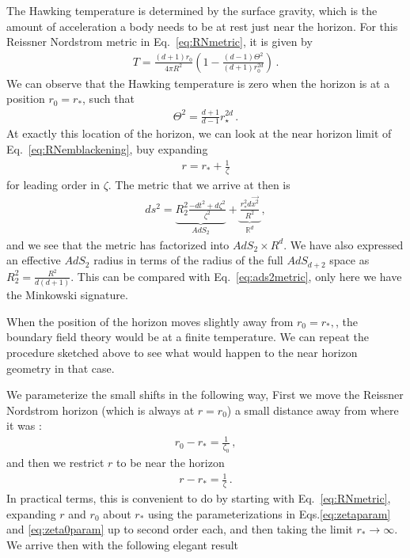 \par
The Hawking temperature is determined by the surface gravity, which is the amount of acceleration a body needs to be at rest just near the horizon. For this Reissner Nordstrom metric in Eq.~\ref{eq:RNmetric}, it is given by~\cite{sachdev2015bekenstein,faulkner2011emergent}
\begin{align}
    T = \frac{(d+1)r_0}{4\pi R^2}\left(1 - \frac{(d-1)\Theta^2}{(d+1)r_0^{2d}}\right) \, .
\end{align}
We can observe that the Hawking temperature is zero when the horizon is at a position $r_0 = r_\ast$, such that 
\begin{align}
    \Theta^2 = \frac{d+1}{d-1} r_\star^{2d} \, .
\end{align}
At exactly this location of the horizon, we can look at the near horizon limit of Eq.~\eqref{eq:RNemblackening}, buy expanding 
\begin{align}
    r = r_* + \frac{1}{\zeta}
\end{align}
for leading order in $\zeta$. The metric that we arrive at then is 
\begin{align}
    ds^2 = \underbrace{R_2^2\frac{-dt^2 + d\zeta^2}{\zeta^2}}_{AdS_2} + \underbrace{\frac{r_\ast^2 d\vec{x^2}}{R^2}}_{\mathbb{R}^d} \, ,
    \label{eq:zerotempAds2}
\end{align}
and we see that the metric has factorized into $AdS_2 \times R^d$. We have also expressed an effective $AdS_2$ radius in terms of the radius of the full $AdS_{d+2}$ space as $R_2^2 = \frac{R^2}{d(d+1)}$. This can be compared with Eq.~\ref{eq:ads2metric}, only here we have the Minkowski signature.
\par
When the position of the horizon moves slightly away from $r_0 = r_\ast, $, the boundary field theory would be at a finite temperature. We can repeat the procedure sketched above to see what would happen to the near horizon geometry in that case. 
\par
We parameterize the small shifts in the following way, First we move the Reissner Nordstrom horizon (which is always at $r=r_0$) a small distance away from where it was :
\begin{align}
    r_0 - r_\ast = \frac{1}{\zeta_0}\, ,
    \label{eq:zeta0param}
\end{align}
and then we restrict $r$ to be near the horizon 
\begin{align}
    r - r_\ast = \frac{1}{\zeta}\, .
    \label{eq:zetaparam}
\end{align}
In practical terms, this is convenient to do by starting with Eq.~\eqref{eq:RNmetric}, expanding $r$ and $r_0$ about $r_\ast$ using the parameterizations in Eqs.\eqref{eq:zetaparam} and \eqref{eq:zeta0param} up to second order each, and then taking the limit $r_\ast \rightarrow \infty$. We arrive then with the following elegant result 
